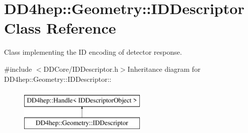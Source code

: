 \hypertarget{class_d_d4hep_1_1_geometry_1_1_i_d_descriptor}{
\section{DD4hep::Geometry::IDDescriptor Class Reference}
\label{class_d_d4hep_1_1_geometry_1_1_i_d_descriptor}
}


Class implementing the ID encoding of detector response.  


{\ttfamily \#include $<$DDCore/IDDescriptor.h$>$}Inheritance diagram for DD4hep::Geometry::IDDescriptor::\begin{figure}[H]
\begin{center}
\leavevmode
\includegraphics[height=2cm]{class_d_d4hep_1_1_geometry_1_1_i_d_descriptor}
\end{center}
\end{figure}
